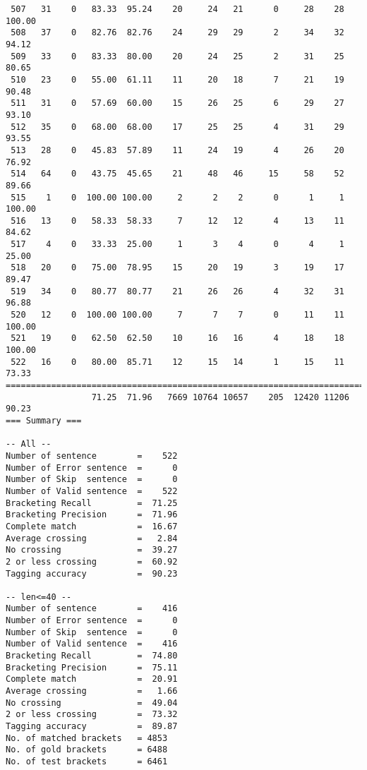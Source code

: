 \begin{verbatim}
 507   31    0   83.33  95.24    20     24   21      0     28    28   100.00
 508   37    0   82.76  82.76    24     29   29      2     34    32    94.12
 509   33    0   83.33  80.00    20     24   25      2     31    25    80.65
 510   23    0   55.00  61.11    11     20   18      7     21    19    90.48
 511   31    0   57.69  60.00    15     26   25      6     29    27    93.10
 512   35    0   68.00  68.00    17     25   25      4     31    29    93.55
 513   28    0   45.83  57.89    11     24   19      4     26    20    76.92
 514   64    0   43.75  45.65    21     48   46     15     58    52    89.66
 515    1    0  100.00 100.00     2      2    2      0      1     1   100.00
 516   13    0   58.33  58.33     7     12   12      4     13    11    84.62
 517    4    0   33.33  25.00     1      3    4      0      4     1    25.00
 518   20    0   75.00  78.95    15     20   19      3     19    17    89.47
 519   34    0   80.77  80.77    21     26   26      4     32    31    96.88
 520   12    0  100.00 100.00     7      7    7      0     11    11   100.00
 521   19    0   62.50  62.50    10     16   16      4     18    18   100.00
 522   16    0   80.00  85.71    12     15   14      1     15    11    73.33
============================================================================
                 71.25  71.96   7669 10764 10657    205  12420 11206    90.23
=== Summary ===

-- All --
Number of sentence        =    522
Number of Error sentence  =      0
Number of Skip  sentence  =      0
Number of Valid sentence  =    522
Bracketing Recall         =  71.25
Bracketing Precision      =  71.96
Complete match            =  16.67
Average crossing          =   2.84
No crossing               =  39.27
2 or less crossing        =  60.92
Tagging accuracy          =  90.23

-- len<=40 --
Number of sentence        =    416
Number of Error sentence  =      0
Number of Skip  sentence  =      0
Number of Valid sentence  =    416
Bracketing Recall         =  74.80
Bracketing Precision      =  75.11
Complete match            =  20.91
Average crossing          =   1.66
No crossing               =  49.04
2 or less crossing        =  73.32
Tagging accuracy          =  89.87
No. of matched brackets   = 4853
No. of gold brackets      = 6488
No. of test brackets      = 6461

\end{verbatim}

\normalsize

